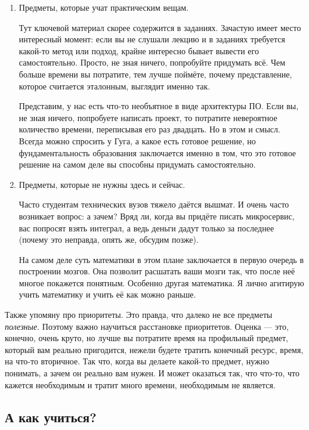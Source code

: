 \documentclass[12pt, a4paper]{article}
\begin{document}
\begin{enumerate}
    \item Предметы, которые учат практическим вещам. 
    
    Тут ключевой материал скорее содержится в заданиях. Зачастую имеет место интересный момент: если вы не слушали лекцию и в заданиях требуется какой-то метод или подход, крайне интересно бывает вывести его самостоятельно. Просто, не зная ничего, попробуйте придумать всё. Чем больше времени вы потратите, тем лучше поймёте, почему представление, которое считается эталонным, выглядит именно так. 
    
    Представим, у нас есть что-то необъятное в виде архитектуры ПО. Если вы, не зная ничего, попробуете написать проект, то потратите невероятное количество времени, переписывая его раз двадцать. Но в этом и смысл. Всегда можно спросить у Гуга, а какое есть готовое решение, но фундаментальность образования заключается именно в том, что это готовое решение на самом деле вы способны придумать самостоятельно.
    \item Предметы, которые не нужны здесь и сейчас. 
    
    Часто студентам технических вузов тяжело даётся вышмат. И очень часто возникает вопрос: а зачем? Вряд ли, когда вы придёте писать микросервис, вас попросят взять интеграл, а ведь деньги дадут только за последнее (почему это неправда, опять же, обсудим позже). 
    
    На самом деле суть математики в этом плане заключается в первую очередь в построении мозгов. Она позволит расшатать ваши мозги так, что после неё многое покажется понятным. Особенно другая математика. Я лично агитирую учить математику и учить её как можно раньше.
\end{enumerate}

Также упомяну про приоритеты. Это правда, что далеко не все предметы \textit{полезные}. Поэтому важно научиться расстановке приоритетов. Оценка --- это, конечно, очень круто, но лучше вы потратите время на профильный предмет, который вам реально пригодится, нежели будете тратить конечный ресурс, время, на что-то вторичное. Так что, когда вы делаете какой-то предмет, нужно понимать, а зачем он реально вам нужен. И может оказаться так, что что-то, что кажется необходимым и тратит много времени, необходимым не является.

\subsection{А как учиться?}
\end{document}
